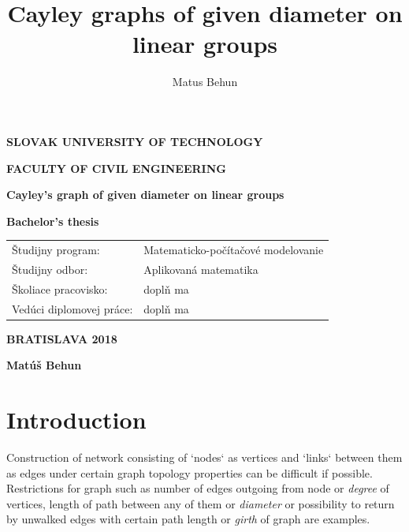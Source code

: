 \documentclass[a4paper,11pt,twoside]{report}%
\author{Matus Behun}
\title{Cayley graphs of given diameter on linear groups}
\begin{document}
\setlength{\belowdisplayskip}{7pt} \setlength{\belowdisplayshortskip}{5pt}
\setlength{\abovedisplayskip}{7pt} \setlength{\abovedisplayshortskip}{5pt}

\thispagestyle{empty}
{
	\topmargin=0pt
	\centerline {\large \bf{SLOVAK UNIVERSITY OF TECHNOLOGY}}
	\vskip 0.2cm
	\centerline{\large \bf{FACULTY OF CIVIL ENGINEERING}}
	\vskip 5cm
	\centerline{\Large \bf{Cayley's graph of given diameter on linear groups}}
	\vskip 0.2cm
	\vskip 0.5cm
	\centerline{\large \bf{Bachelor's thesis}}
	\vskip 5cm          %
	\normalsize
		\begin{tabular}[l]{p{}p{}}
		Študijny program: & Matematicko-počítačové modelovanie\\
		Študijny odbor: & Aplikovaná matematika\\
		Školiace pracovisko: & doplň ma\\
		Vedúci diplomovej práce: & doplň ma \\
		\end{tabular}
	\vskip 3cm
	\centerline{\large \bf{BRATISLAVA 2018}}
	\vskip 0.2cm
	\centerline{\large \bf{Matúš Behun}}
}

\pagebreak
\tableofcontents
\newpage


\section{Introduction}

Construction of network consisting of `nodes` as vertices and `links` between them as edges under certain graph topology properties can be difficult if possible. Restrictions for graph such as number of edges outgoing from node or \textit{degree} of vertices, length of path between any of them or \textit{diameter} or possibility to return by unwalked edges with certain path length or \textit{girth} of graph are examples. 
\end{document}
